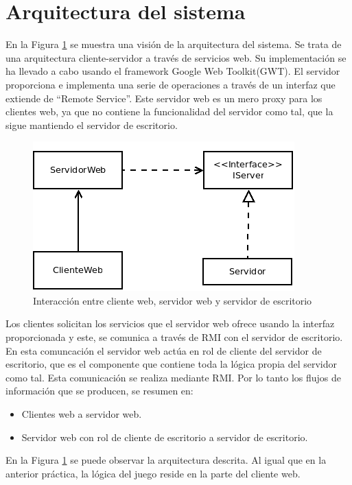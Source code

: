 \section{Arquitectura del sistema}

En la Figura \ref{arq} se muestra una visión de la arquitectura del sistema. Se
trata de una arquitectura cliente-servidor a través de servicios web. Su implementación se ha llevado a cabo usando el framework Google Web Toolkit(GWT).
El servidor proporciona e implementa una serie de operaciones a través de un interfaz que extiende de ``Remote Service''. Este servidor web es un mero proxy para los clientes web, ya que no contiene la funcionalidad del servidor como tal, que la sigue mantiendo el servidor de escritorio.

 \begin{figure}[h]
 \centering
 \includegraphics[scale=0.65]{img/arq.png}
 \caption{Interacción entre cliente web, servidor web y servidor de escritorio}
 \label{arq}
 \end{figure}

Los clientes solicitan los servicios que el servidor web ofrece usando la interfaz proporcionada y este, se comunica a través de RMI con el servidor de escritorio. En esta comuncación el servidor web actúa en rol de cliente del servidor de escritorio, que es el componente que contiene toda la lógica propia del servidor como tal. Esta comunicación se realiza mediante RMI.
Por lo tanto los flujos de información que se producen, se resumen en:
\begin{itemize}
 \item Clientes web a servidor web.
\item Servidor web con rol de cliente de escritorio a servidor de escritorio.
\end{itemize}
En la Figura \ref{arq} se puede observar la arquitectura descrita.
Al igual que en la anterior práctica, la lógica del juego reside en la parte del cliente web.

